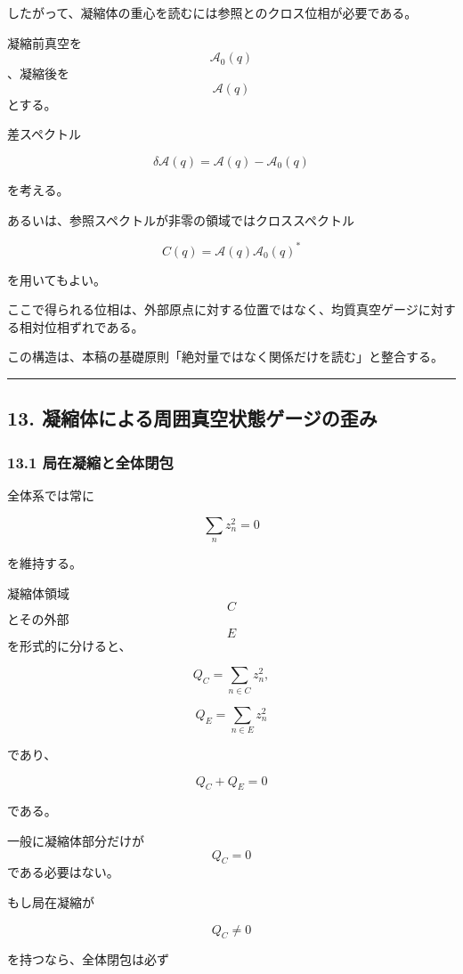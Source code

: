 \documentclass[
  a4paper,
]{ltjsarticle}
\begin{document}
したがって、凝縮体の重心を読むには参照とのクロス位相が必要である。

凝縮前真空を \[\mathcal A_0(q)\]、凝縮後を \[\mathcal A(q)\] とする。

差スペクトル

\[
\boxed{
\delta\mathcal A(q)
=
\mathcal A(q)-\mathcal A_0(q)
}
\tag{36}
\]

を考える。

あるいは、参照スペクトルが非零の領域ではクロススペクトル

\[
\boxed{
C(q)
=
\mathcal A(q)
\mathcal A_0(q)^*
}
\tag{37}
\]

を用いてもよい。

ここで得られる位相は、外部原点に対する位置ではなく、均質真空ゲージに対する相対位相ずれである。

この構造は、本稿の基礎原則「絶対量ではなく関係だけを読む」と整合する。

\begin{center}\rule{0.5\linewidth}{0.5pt}\end{center}

\subsection{13.
凝縮体による周囲真空状態ゲージの歪み}\label{ux51ddux7e2eux4f53ux306bux3088ux308bux5468ux56f2ux771fux7a7aux72b6ux614bux30b2ux30fcux30b8ux306eux6b6aux307f}

\subsubsection{13.1
局在凝縮と全体閉包}\label{ux5c40ux5728ux51ddux7e2eux3068ux5168ux4f53ux9589ux5305}

全体系では常に

\[
\sum_n z_n^2=0
\]

を維持する。

凝縮体領域 \[C\] とその外部 \[E\] を形式的に分けると、

\[
Q_C
=
\sum_{n\in C}z_n^2,
\]

\[
Q_E
=
\sum_{n\in E}z_n^2
\]

であり、

\[
\boxed{
Q_C+Q_E=0
}
\tag{38}
\]

である。

一般に凝縮体部分だけが \[Q_C=0\] である必要はない。

もし局在凝縮が

\[
Q_C\neq0
\]

を持つなら、全体閉包は必ず
\end{document}
